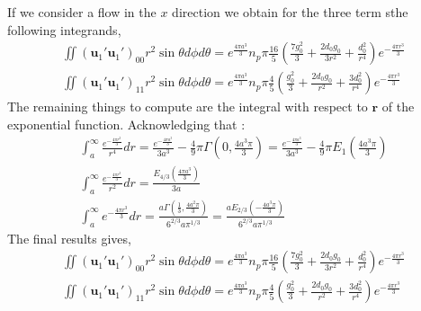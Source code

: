 If we consider a flow in the $x$ direction we obtain for the three term sthe following integrands,
\begin{align*}
    \iint (\textbf{u}_1'\textbf{u}_1')_{00} r^2 \sin\theta d\phi d\theta
    = e^{\frac{4 \pi a^{3}}{3}}n_{p} \pi \frac{16}{5}\left(\frac{7   g^{2}_0  }{3} 
    + \frac{2   d_0 g_0 }{3 r^{2}} 
    + \frac{   d^{2}_0 }{ r^{4}} \right)e^{- \frac{4 \pi r^{3}}{3}}\\
    \iint (\textbf{u}_1'\textbf{u}_1')_{11}  r^2 \sin\theta d\phi d\theta
    =e^{\frac{4 \pi a^{3}}{3}}n_{p}\pi\frac{4}{5}
    \left(
        \frac{  g^{2}_0}{3} 
        + \frac{2   d_0 g_0 }{ r^{2}} 
        + \frac{3   d^{2}_0 }{ r^{4}}
    \right)e^{- \frac{4 \pi r^{3}}{3}}
\end{align*}
The remaining things to compute are the integral with respect to $\textbf{r}$ of the exponential function. 
Acknowledging that : 
\begin{align*}
    \int_a^\infty \frac{e^{- \frac{4 \pi r^{3}}{3}}}{r^4} dr
    = \frac{e^{- \frac{4 \pi a^{3}}{3}}}{3a^3}
    - \frac{4}{9} \pi \Gamma\left(0,\frac{4a^3\pi}{3}\right)
    = \frac{e^{- \frac{4 \pi a^{3}}{3}}}{3a^3}
    - \frac{4}{9} \pi E_1\left(\frac{4a^3\pi}{3}\right)
    \\
    \int_a^\infty \frac{e^{- \frac{4 \pi r^{3}}{3}}}{r^2} dr
    = \frac{E_{4/3}(\frac{4\pi a^3}{3})}{3a}\\
    \int_a^\infty e^{- \frac{4 \pi r^{3}}{3}} dr
    = \frac{a \Gamma\left(\frac{1}{3},\frac{4 a^2 \pi}{3}\right)}
    {6^{2/3} a \pi^{1/3}}
    = \frac{a E_{2/3}\left(-\frac{4 a^3 \pi}{3}\right)}
    {6^{2/3} a \pi^{1/3}}
\end{align*}
The final results gives, 
\begin{align*}
    \iint (\textbf{u}_1'\textbf{u}_1')_{00} r^2 \sin\theta d\phi d\theta
    = e^{\frac{4 \pi a^{3}}{3}}n_{p} \pi \frac{16}{5}\left(\frac{7   g^{2}_0  }{3} 
    + \frac{2   d_0 g_0 }{3 r^{2}} 
    + \frac{   d^{2}_0 }{ r^{4}} \right)e^{- \frac{4 \pi r^{3}}{3}}\\
    \iint (\textbf{u}_1'\textbf{u}_1')_{11}  r^2 \sin\theta d\phi d\theta
    =e^{\frac{4 \pi a^{3}}{3}}n_{p}\pi\frac{4}{5}
    \left(
        \frac{  g^{2}_0}{3} 
        + \frac{2   d_0 g_0 }{ r^{2}} 
        + \frac{3   d^{2}_0 }{ r^{4}}
    \right)e^{- \frac{4 \pi r^{3}}{3}}
\end{align*}